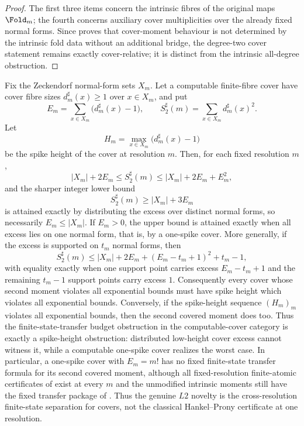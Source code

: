\begin{proof}
The first three items concern the intrinsic fibres of the original maps
\(\Fold_m\); the fourth concerns auxiliary cover multiplicities over the already
fixed normal forms.  Since  proves
that cover-moment behaviour is not determined by the intrinsic fold data without
an additional bridge, the degree-two cover statement remains exactly
cover-relative; it is distinct from the intrinsic all-degree obstruction.
\end{proof}

\begin{theorem}
\label{prop:L2-novelty-finite-state-separation}
\label{thm:L2-one-spike-separation-criterion}
Fix the Zeckendorf normal-form sets \(X_m\).  Let a computable finite-fibre cover
have cover fibre sizes \(d_m^\sharp(x)\ge1\) over \(x\in X_m\), and put
\[
  E_m=\sum_{x\in X_m}\bigl(d_m^\sharp(x)-1\bigr),
  \qquad
  S_2^\sharp(m)=\sum_{x\in X_m}d_m^\sharp(x)^2 .
\]
Let
\[
  H_m=\max_{x\in X_m}\bigl(d_m^\sharp(x)-1\bigr)
\]
be the spike height of the cover at resolution \(m\).  Then, for each fixed
resolution \(m\),
\[
  |X_m|+2E_m\le S_2^\sharp(m)
  \le |X_m|+2E_m+E_m^2,
\]
and the sharper integer lower bound
\[
  S_2^\sharp(m)
  \ge |X_m|+3E_m
\]
is attained exactly by distributing the excess over distinct normal forms, so
necessarily \(E_m\le |X_m|\).  If \(E_m>0\), the upper bound is attained exactly
when all excess lies on one normal form, that is, by a one-spike cover.  More
generally, if the excess is supported
on \(t_m\) normal forms, then
\[
  S_2^\sharp(m)
  \le |X_m|+2E_m+(E_m-t_m+1)^2+t_m-1,
\]
with equality exactly when one support point carries excess \(E_m-t_m+1\) and the
remaining \(t_m-1\) support points carry excess \(1\).  Consequently every cover
whose second moment violates all exponential bounds must have spike height which
violates all exponential bounds.  Conversely, if the spike-height sequence
\((H_m)_m\) violates all exponential bounds, then the second covered moment does
too.  Thus the finite-state-transfer budget obstruction in the computable-cover
category is exactly a spike-height obstruction: distributed low-height cover
excess cannot witness it, while a computable one-spike cover realizes the worst
case.  In particular, a one-spike cover with \(E_m=m!\) has no fixed finite-state
transfer formula for its second covered moment, although all fixed-resolution
finite-atomic certificates of
 exist at every \(m\) and the
unmodified intrinsic moments still have the fixed transfer package of
.  Thus the genuine \(L2\) novelty is
the cross-resolution finite-state separation for covers, not the classical
Hankel--Prony certificate at one resolution.
\end{theorem}

